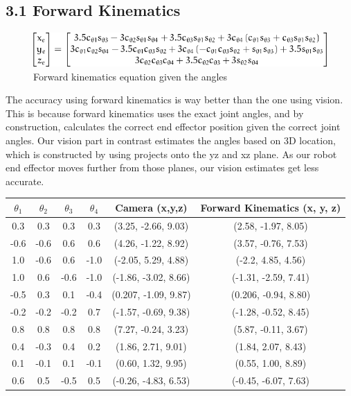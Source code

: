 

\subsection{3.1 Forward Kinematics}

\begin{figure}[ht]
\includegraphics[]{x_y_z.png}
\caption{Forward kinematics equation given the angles}
\end{figure}
The accuracy using forward kinematics is way better than the one using vision. This is because forward kinematics uses the exact joint angles, and by construction, calculates the correct end effector position given the correct joint angles. Our vision part in contrast estimates the angles based on 3D location, which is constructed by using projects onto the yz and xz plane. As our robot end effector moves further from those planes, our vision estimates get less accurate.
\begin{center}
\begin{tabular}{|c|c|c|c|c|c|}
\hline
$\theta_1 $ & $ \theta_2 $ & $ \theta_3 $ & $ \theta_4 $ & Camera (x,y,z) & Forward Kinematics (x, y, z) \\\hline
 0.3 & 0.3 & 0.3 & 0.3 & (3.25, -2.66, 9.03) & (2.58, -1.97, 8.05) \\ \hline
 -0.6 & -0.6 & 0.6 & 0.6 & (4.26, -1.22, 8.92) & (3.57, -0.76, 7.53) \\ \hline
 1.0 & -0.6 & 0.6 & -1.0 & (-2.05, 5.29, 4.88) & (-2.2, 4.85, 4.56) \\ \hline
 1.0 & 0.6 & -0.6 & -1.0 & (-1.86, -3.02, 8.66) & (-1.31, -2.59, 7.41) \\ \hline
 -0.5 & 0.3 & 0.1 & -0.4 & (0.207, -1.09, 9.87) & (0.206, -0.94, 8.80) \\ \hline
 -0.2 & -0.2 & -0.2 & 0.7 & (-1.57, -0.69, 9.38) & (-1.28, -0.52, 8.45) \\ \hline
 0.8 & 0.8 & 0.8 & 0.8 & (7.27, -0.24, 3.23) & (5.87, -0.11, 3.67) \\ \hline
 0.4 & -0.3 & 0.4 & 0.2 & (1.86, 2.71, 9.01) & (1.84, 2.07, 8.43) \\ \hline
 0.1 & -0.1 & 0.1 & -0.1 & (0.60, 1.32, 9.95) & (0.55, 1.00, 8.89) \\ \hline
 0.6 & 0.5 & -0.5 & 0.5 & (-0.26, -4.83, 6.53) & (-0.45, -6.07, 7.63) \\ \hline
\end{tabular}
\end{center}
